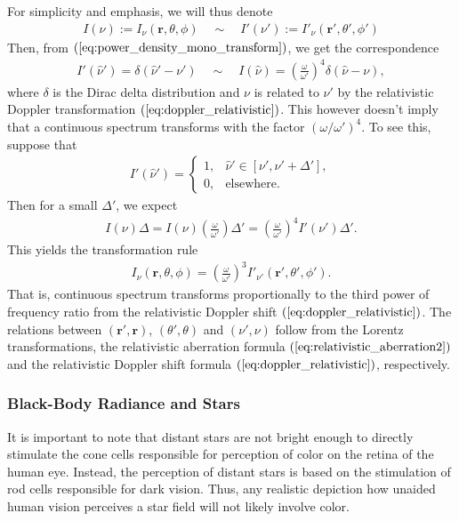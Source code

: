 \documentclass [12pt, a4paper] {article}
\newcommand{\vc}[1]
{
	\boldsymbol{#1}
}
\begin{document}
For simplicity and emphasis, we will thus denote
\begin {eqnarray}
    I(\nu) := I_\nu(\vc r, \theta, \phi)
    \quad\sim\quad
    I'(\nu') := I'_\nu(\vc r', \theta', \phi')
\end {eqnarray}
Then, from 
$(\ref{eq:power_density_mono_transform})$, we get the correspondence 
\begin {eqnarray}
    I'(\hat\nu') = \delta(\hat\nu' - \nu')
    \quad\sim\quad
    I(\hat\nu) = \left(\frac{\omega}{\omega'}\right)^4\delta(\hat\nu - \nu),
\end {eqnarray}
where $\delta$ is the Dirac delta distribution and $\nu$ is related to $\nu'$
by the relativistic Doppler transformation $(\ref{eq:doppler_relativistic})$.
This however doesn't imply that a continuous spectrum transforms with the 
factor $(\omega/\omega')^4$. To see this, suppose that 
\begin {eqnarray}
    I'(\hat \nu') = 
    \left\{
        \begin {array}{ll}
            1, & \hat\nu'\in[\nu', \nu' + \Delta'], \\
            0, & \textrm{elsewhere}.
        \end {array}
    \right.
\end {eqnarray}
Then for a small $\Delta'$, we expect 
\begin {eqnarray}
    I(\nu)\Delta 
    = 
    I(\nu)\left(\frac{\omega}{\omega'}\right)\Delta'
    =
    \left(\frac{\omega}{\omega'}\right)^4 I'(\nu')\Delta'.
\end {eqnarray}
This yields the transformation rule 
\begin {eqnarray}
    \label{eq:radiance_continuous_transform}
    \boxed{
        \quad 
        I_\nu(\vc r, \theta, \phi) 
        = 
        \left(\frac{\omega}{\omega'}\right)^3I'_{\nu'}(\vc r', \theta', \phi').
        \quad
    }
\end {eqnarray}
That is, continuous spectrum transforms proportionally to the third power of 
frequency ratio from the relativistic Doppler shift $(\ref{eq:doppler_relativistic})$.
The relations between $(\vc r', \vc r)$, $(\theta', \theta)$ and $(\nu', \nu)$ follow
from the Lorentz transformations, the relativistic aberration formula 
$(\ref{eq:relativistic_aberration2})$ and the relativistic Doppler shift formula 
$(\ref{eq:doppler_relativistic})$, respectively.


\subsubsection{Black-Body Radiance and Stars}
It is important to note that distant stars are not bright enough to directly 
stimulate the cone cells responsible for perception of color on the retina of 
the human eye. Instead, the perception of distant stars is based 
on the stimulation of rod cells responsible for dark vision. Thus, any realistic
depiction how unaided human vision perceives a star field will not likely involve 
color. 
\end{document}
